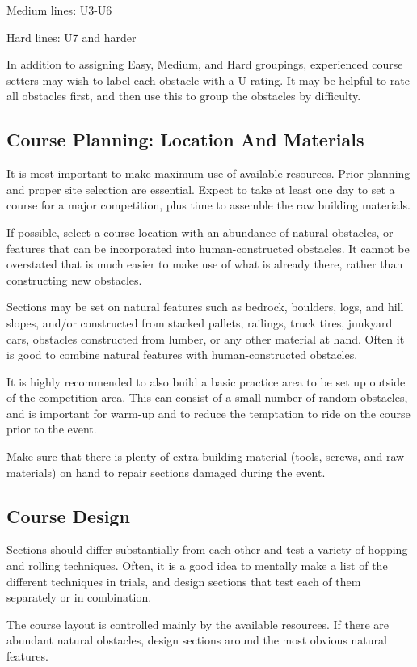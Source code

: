 Medium lines: U3-U6

Hard lines: U7 and harder

In addition to assigning Easy, Medium, and Hard groupings, experienced course setters may wish to label each obstacle with a U-rating.
It may be helpful to rate all obstacles first, and then use this to group the obstacles by difficulty.

\subsection{Course Planning: Location And Materials}
It is most important to make maximum use of available resources.
Prior planning and proper site selection are essential.
Expect to take at least one day to set a course for a major competition, plus time to assemble the raw building materials.

If possible, select a course location with an abundance of natural obstacles, or features that can be incorporated into human-constructed obstacles.
It cannot be overstated that is much easier to make use of what is already there, rather than constructing new obstacles.

Sections may be set on natural features such as bedrock, boulders, logs, and hill slopes, and/or constructed from stacked pallets, railings, truck tires, junkyard cars, obstacles constructed from lumber, or any other material at hand.
Often it is good to combine natural features with human-constructed obstacles.

It is highly recommended to also build a basic practice area to be set up outside of the competition area.
This can consist of a small number of random obstacles, and is important for warm-up and to reduce the temptation to ride on the course prior to the event.

Make sure that there is plenty of extra building material (tools, screws, and raw materials) on hand to repair sections damaged during the event.

\subsection{Course Design}
Sections should differ substantially from each other and test a variety of hopping and rolling techniques.
Often, it is a good idea to mentally make a list of the different techniques in trials, and design sections that test each of them separately or in combination.

The course layout is controlled mainly by the available resources.
If there are abundant natural obstacles, design sections around the most obvious natural features.

